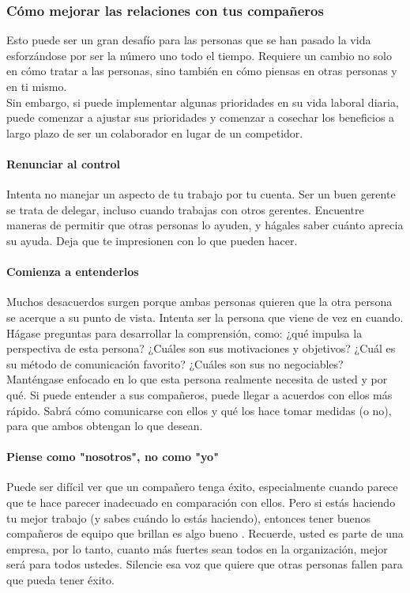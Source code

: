 \documentclass[10pt]{book}
\begin{document}
\subsubsection{Cómo mejorar las relaciones con tus compañeros}
Esto puede ser un gran desafío para las personas que se han pasado la vida esforzándose por ser la número uno todo el tiempo. Requiere un cambio no solo en cómo tratar a las personas, sino también en cómo piensas en otras personas y en ti mismo.\\
Sin embargo, si puede implementar algunas prioridades en su vida laboral diaria, puede comenzar a ajustar sus prioridades y comenzar a cosechar los beneficios a largo plazo de ser un colaborador en lugar de un competidor.
\paragraph{Renunciar al control}
Intenta no manejar un aspecto de tu trabajo por tu cuenta. Ser un buen gerente se trata de delegar, incluso cuando trabajas con otros gerentes. Encuentre maneras de permitir que otras personas lo ayuden, y hágales saber cuánto aprecia su ayuda. Deja que te impresionen con lo que pueden hacer.
\paragraph{Comienza a entenderlos}
Muchos desacuerdos surgen porque ambas personas quieren que la otra persona se acerque a su punto de vista. Intenta ser la persona que viene de vez en cuando. Hágase preguntas para desarrollar la comprensión, como: ¿qué impulsa la perspectiva de esta persona? ¿Cuáles son sus motivaciones y objetivos? ¿Cuál es su método de comunicación favorito? ¿Cuáles son sus no negociables?\\
Manténgase enfocado en lo que esta persona realmente necesita de usted y por qué. Si puede entender a sus compañeros, puede llegar a acuerdos con ellos más rápido. Sabrá cómo comunicarse con ellos y qué los hace tomar medidas (o no), para que ambos obtengan lo que desean.
\paragraph{Piense como "nosotros", no como "yo"}
Puede ser difícil ver que un compañero tenga éxito, especialmente cuando parece que te hace parecer inadecuado en comparación con ellos. Pero si estás haciendo tu mejor trabajo (y sabes cuándo lo estás haciendo), entonces tener buenos compañeros de equipo que brillan es algo bueno . Recuerde, usted es parte de una empresa, por lo tanto, cuanto más fuertes sean todos en la organización, mejor será para todos ustedes. Silencie esa voz que quiere que otras personas fallen para que pueda tener éxito.
\end{document}
